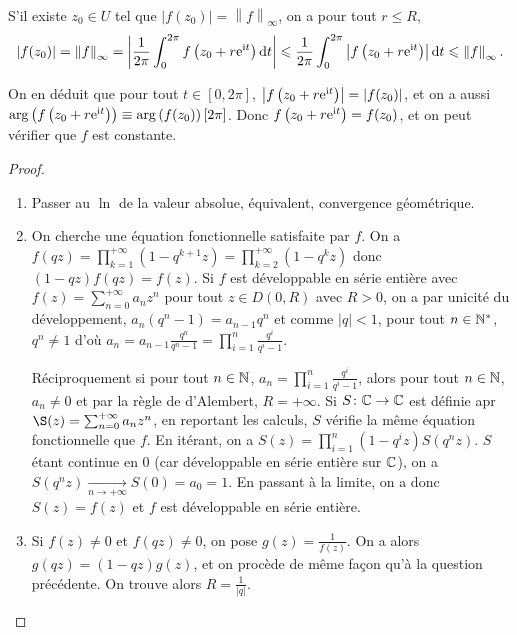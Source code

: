 \documentclass[12pt]{article}
\begin{document}
\begin{remark}
    S'il existe $z_{0}\in U$ tel que $\left\lvert f(z_{0})\right\rvert=\left\lVert f\right\rVert_{\infty}$, on a pour tout $r\leqslant R$,
    \begin{equation}
        \left\lvert f(z_{0})\right\rvert=\left\lVert f\right\rVert_{\infty}=\left\lvert \frac{1}{2\pi}\int_{0}^{2\pi}f\left(z_{0}+r\mathrm{e}^{\mathrm{i} t}\right)\mathrm{d} t\right\rvert\leqslant\frac{1}{2\pi}\int_{0}^{2\pi}\left\lvert f\left(z_{0}+r\mathrm{e}^{\mathrm{i} t}\right)\right\rvert\mathrm{d} t\leqslant\left\lVert f\right\rVert_{\infty}.
    \end{equation}

    On en déduit que pour tout $t\in[0,2\pi]$, $\left\lvert f\left(z_0+r\mathrm{e}^{\mathrm{i} t}\right)\right\rvert=\left\lvert f(z_{0})\right\rvert$, et on a aussi $\arg\left(f\left(z_{0}+r\mathrm{e}^{\mathrm{i} t}\right)\right)\equiv\arg\left(f(z_0)\right)[2\pi]$. Donc $f\left(z_{0}+r\mathrm{e}^{\mathrm{i} t}\right)=f(z_{0})$, et on peut vérifier que $f$ est constante.
\end{remark}

\begin{proof}
    \phantom{}
    \begin{enumerate}
        \item Passer au $\ln$ de la valeur absolue, équivalent, convergence géométrique.
        \item On cherche une équation fonctionnelle satisfaite par $f$.
        On a $f(qz)=\prod_{k=1}^{+\infty}\left(1-q^{k+1}z\right)=\prod_{k=2}^{+\infty}\left(1-q^{k}z\right)$ donc $(1-qz)f(qz)=f(z)$.
        Si $f$ est développable en série entière avec $f(z)=\sum_{n=0}^{+\infty}a_nz^{n}$ pour tout $z\in D(0,R)$ avec $R>0$, on a par unicité du développement, $a_n(q^{n}-1)=a_{n-1}q^{n}$ et comme $\left\lvert q\right\rvert<1$, pour tout $n\in\mathbb{N}^{*}$, $q^{n}\neq1$ d'où $a_{n}=a_{n-1}\frac{q^{n}}{q^{n}-1}=\prod_{i=1}^{n}\frac{q^{i}}{q^{i}-1}$.

        Réciproquement si pour tout $n\in\mathbb{N}$, $a_n=\prod_{i=1}^{n}\frac{q^{i}}{q^{i}-1}$, alors pour tout $n\in\mathbb{N}$, $a_n\neq0$ et par la règle de d'Alembert, $R=+\infty$. Si $S\colon\mathbb{C}\to\mathbb{C}$ est définie apr $\S(z)=\sum_{n=0}^{+\infty}a_n z^{n}$, en reportant les calculs, $S$ vérifie la même équation fonctionnelle que $f$. En itérant, on a $S(z)=\prod_{i=1}^{n}(1-q^{i}z)S(q^{n}z)$. $S$ étant continue en 0 (car développable en série entière sur $\mathbb{C}$), on a $S(q^{n}z)\xrightarrow[n\to+\infty]{}S(0)=a_0=1$. En passant à la limite, on a donc $S(z)=f(z)$ et $f$ est développable en série entière.

        \item Si $f(z)\neq0$ et $f(qz)\neq0$, on pose $g(z)=\frac{1}{f(z)}$. On a alors $g(qz)=(1-qz)g(z)$, et on procède de même façon qu'à la question précédente. On trouve alors $R=\frac{1}{\left\lvert q\right\rvert}$.
    \end{enumerate}
\end{proof}
\end{document}
